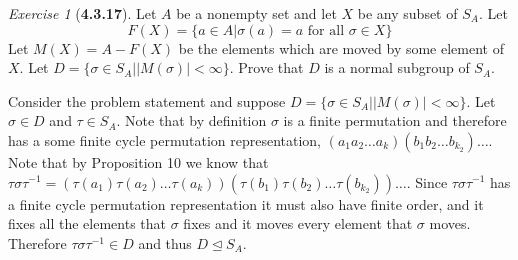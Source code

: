 \documentclass[12pt]{amsart}
\makeatletter
\theoremstyle{remark}
\newtheorem*{exercise}{Exercise}%
\renewenvironment{proof}[1][\proofname]{\par\doublespacing
  \pushQED{\qed}%
  \normalfont \topsep6\p@\@plus6\p@\relax
  \list{}{%
    \settowidth{\leftmargin}{\itshape\proofname:\hskip\labelsep}%
    \setlength{\labelwidth}{0pt}%
    \setlength{\itemindent}{-\leftmargin}%
  }%
  \item[\hskip\labelsep\itshape#1\@addpunct{:}]\ignorespaces
}{%
  \popQED\endlist\@endpefalse
  \singlespacing
}
\theoremstyle{mycomment}
\makeatother
\begin{document}
\begin{exercise}[\textbf{4.3.17}] Let $A$ be a nonempty set and let $X$ be any subset of $S_A$. Let 
  \begin{equation*}
    F(X) = \{a \in A| \sigma(a) = a\text{ for all }\sigma \in X\}
  \end{equation*}
  Let $M(X) = A - F(X)$ be the elements which are moved by some element of $X$. Let $D = \{\sigma \in S_A | |M(\sigma)| < \infty\}$. 
  Prove that $D$ is a normal subgroup of $S_A$.  
 \begin{proof} Consider the problem statement and suppose $D = \{\sigma \in S_A | |M(\sigma)| < \infty\}$. Let $\sigma \in D$ and 
  $\tau \in S_A$. Note that by definition $\sigma$ is a finite permutation and therefore has a some finite cycle permutation representation, 
  $(a_1a_2\dots a_k)(b_1b_2\dots b_{k_2})\dots$. Note that by Proposition 10 we know that $\tau \sigma \tau^{-1} = (\tau(a_1)\tau(a_2)\dots \tau(a_k))(\tau(b_1)\tau(b_2)\dots \tau(b_{k_2}))\dots$. Since $\tau \sigma \tau^{-1}$ has a finite cycle permutation representation it must also have finite order, and it fixes all the elements that $\sigma$ fixes and it moves every element that $\sigma$ moves. Therefore 
  $\tau \sigma \tau^{-1} \in D$ and thus $D \trianglelefteq S_A$. 
 \end{proof}
\end{exercise}
\vspace{.15in}
\end{document}

